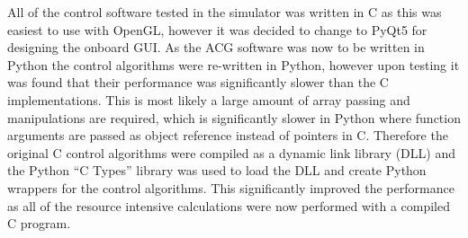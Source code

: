 \documentclass[11pt,landscape]{article}
\begin{document}
\begin{multicols}{3}
All of the control software tested in the simulator was written in C as this was
easiest to use with OpenGL, however it was decided to change to PyQt5 for designing
the onboard GUI. As the ACG software was now to be written in Python the control
algorithms were re-written in Python, however upon testing it was found that
their performance was significantly slower than the C implementations. This is
most likely a large amount of array passing and manipulations are required,
which is significantly slower in Python where function arguments are passed as
object reference instead of pointers in C. Therefore the original C control
algorithms were compiled as a dynamic link library (DLL) and the Python ``C
Types'' library was used to load the DLL and create Python wrappers for the
control algorithms. This significantly improved the performance as all of the
resource intensive calculations were now performed with a compiled C program.


\end{multicols}
\end{document}
